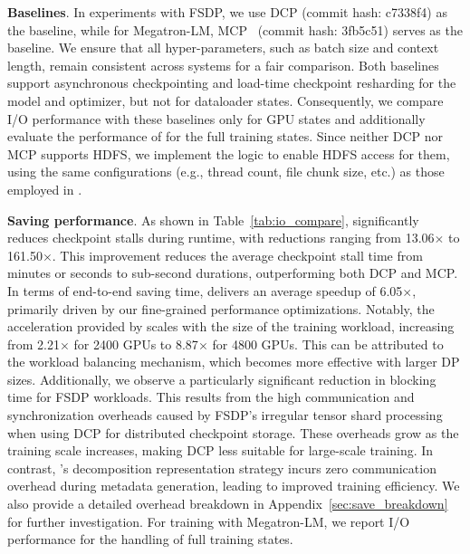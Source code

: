 \noindent \textbf{Baselines}.
In experiments with FSDP, we use DCP (commit hash: c7338f4) as the baseline, while for Megatron-LM, MCP~\cite{megatron-dcp} (commit hash: 3fb5c51) serves as the baseline.
We ensure that all hyper-parameters, such as batch size and context length, remain consistent across systems for a fair comparison.
Both baselines support asynchronous checkpointing and load-time checkpoint resharding for the model and optimizer, but not for dataloader states.
Consequently, we compare I/O performance with these baselines only for GPU states and additionally evaluate the performance of \sys{} for the full training states. 
Since neither DCP nor MCP supports HDFS, we implement the 
logic to enable HDFS access for them, 
using the same configurations (e.g., thread count, file chunk size, etc.) as those employed in \sys{}.

\noindent \textbf{Saving performance}.
As shown in Table~\ref{tab:io_compare}, \sys{} significantly reduces checkpoint stalls during runtime, with reductions ranging from 13.06$\times$ to 161.50$\times$. This improvement reduces the average checkpoint stall time from minutes or seconds to sub-second durations, outperforming both DCP and MCP.
In terms of end-to-end saving time, \sys{} delivers an average speedup of 6.05$\times$, primarily driven by our fine-grained performance optimizations.
Notably, the acceleration provided by \sys{} scales with the size of the training workload, increasing from 2.21$\times$ for 2400 GPUs to 8.87$\times$ for 4800 GPUs.
This can be attributed to the workload balancing mechanism, which becomes more effective with larger DP sizes.
Additionally, we observe a particularly significant reduction in blocking time for FSDP workloads. This results from the high communication and synchronization overheads caused by FSDP’s irregular tensor shard processing when using DCP for distributed checkpoint storage. These overheads grow as the training scale increases, making DCP less suitable for large-scale training.
In contrast, \sys{}'s decomposition representation strategy incurs zero communication overhead during metadata generation, leading to improved training efficiency.
We also provide a detailed overhead breakdown in Appendix~\ref{sec:save_breakdown} for further investigation.
For training with Megatron-LM, we report I/O performance for the handling of full training states.

